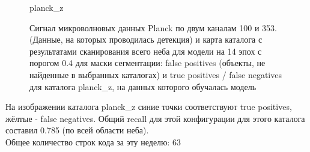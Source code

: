 \documentclass{article}
\begin{document}
\begin{figure}[h]
\begin{minipage}[h]{0.47\linewidth}
    \end{minipage}
\hfill
    \begin{minipage}[h]{0.47\linewidth}
         planck\_z \\
    \end{minipage}
    \caption{Сигнал микроволновых данных Planck по двум каналам 100 и 353. (Данные, на которых
        проводилась детекция) и карта каталога с результатами сканирования всего неба для модели 
        на 14 эпох с порогом 0.4 для маски сегментации: false positives (объекты, не найденные в 
        выбранных каталогах) и true positives / false negatives для каталога planck\_z, на данных 
        которого обучалась модель}
\end{figure}
На изображении каталога planck\_z синие точки соответствуют true positives, жёлтые - false 
negatives. Общий recall для этой конфигурации для этого каталога составил 0.785 (по всей области 
неба).\\
Общее количество строк кода за эту неделю: 63\\
\end{document}
